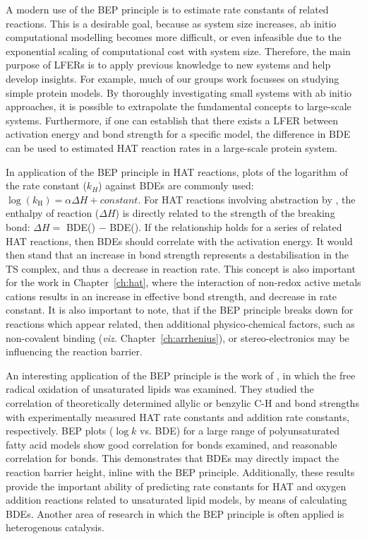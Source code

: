 A modern use of the BEP principle is to estimate rate constants of related reactions. This is a desirable goal, because as system size increases, ab initio computational modelling becomes more difficult, or even infeasible due to the exponential scaling of computational cost with system size. Therefore, the main purpose of LFERs is to apply previous knowledge to new systems and help develop insights. For example, much of our groups work focusses on studying simple protein models. By thoroughly investigating small systems with ab initio approaches, it is possible to extrapolate the fundamental concepts to large-scale systems. Furthermore, if one can establish that there exists a LFER between activation energy and bond strength for a specific model, the difference in BDE can be used to estimated HAT reaction rates in a large-scale protein system.

In application of the BEP principle in HAT reactions, plots of the logarithm of the rate constant ($k_H$) against BDEs are commonly used: $\log(k_\mathrm{H}) = \alpha \Delta H + constant$. For HAT reactions involving abstraction by \cumo, the enthalpy of reaction ($\Delta H$) is directly related to the strength of the breaking bond: $\Delta H =$ BDE() $-$ BDE(). If the relationship holds for a series of related HAT reactions, then BDEs should correlate with the activation energy. It would then stand that an increase in bond strength represents a destabilisation in the TS complex, and thus a decrease in reaction rate. This concept is also important for the work in Chapter~\ref{ch:hat}, where the interaction of non-redox active metals cations results in an increase in effective bond strength, and decrease in rate constant. It is also important to note, that if the BEP principle breaks down for reactions which appear related, then additional physico-chemical factors, such as non-covalent binding (\emph{viz.} Chapter~\ref{ch:arrhenius}), or stereo-electronics may be influencing the reaction barrier.

An interesting application of the BEP principle is the work of \citet{Pratt2003}, in which the free radical oxidation of unsaturated lipids was examined. They studied the correlation of theoretically determined allylic or benzylic C-H and  bond strengths with experimentally measured HAT rate constants and  addition rate constants, respectively. BEP plots ($\log k$ vs. BDE) for a large range of polyunsaturated fatty acid models show good correlation for  bonds examined, and reasonable correlation for  bonds. This demonstrates that BDEs may directly impact the reaction barrier height, inline with the BEP principle. Additionally, these results provide the important ability of predicting rate constants for HAT and oxygen addition reactions related to unsaturated lipid models, by means of calculating BDEs. Another area of research in which the BEP principle is often applied is heterogenous catalysis.\cite{Panov2015}


